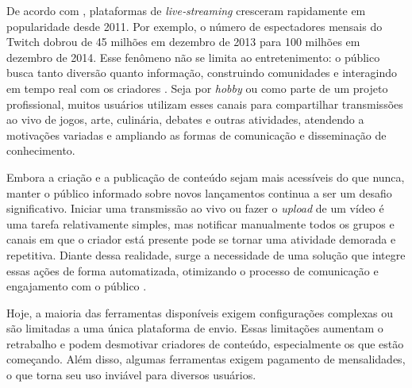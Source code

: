 
De acordo com \cite{hilvert&neill&sjoblow&hamari2018}, plataformas de \textit{live‑streaming} cresceram rapidamente em popularidade desde 2011. Por exemplo, o número de espectadores mensais do Twitch dobrou de 45 milhões em dezembro de 2013 para 100 milhões em dezembro de 2014. Esse fenômeno não se limita ao entretenimento: o público busca tanto diversão quanto informação, construindo comunidades e interagindo em tempo real com os criadores \cite{cheung&huang2011, sjoblom&hamari2017}. Seja por \textit{hobby} ou como parte de um projeto profissional, muitos usuários utilizam esses canais para compartilhar transmissões ao vivo de jogos, arte, culinária, debates e outras atividades, atendendo a motivações variadas e ampliando as formas de comunicação e disseminação de conhecimento.

Embora a criação e a publicação de conteúdo sejam mais acessíveis do que nunca, manter o público informado sobre novos lançamentos continua a ser um desafio significativo. Iniciar uma transmissão ao vivo ou fazer o \textit{upload} de um vídeo é uma tarefa relativamente simples, mas notificar manualmente todos os grupos e canais em que o criador está presente pode se tornar uma atividade demorada e repetitiva. Diante dessa realidade, surge a necessidade de uma solução que integre essas ações de forma automatizada, otimizando o processo de comunicação e engajamento com o público \cite{rizk2020,rahmati2017}.


Hoje, a maioria das ferramentas disponíveis exigem configurações complexas ou são limitadas a uma única plataforma de envio. Essas limitações aumentam o retrabalho e podem desmotivar criadores de conteúdo, especialmente os que estão começando. Além disso, algumas ferramentas exigem pagamento de mensalidades, o que torna seu uso inviável para diversos usuários. 

